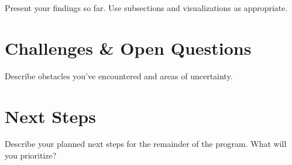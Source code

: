 \documentclass[midterm]{sparreport}
\begin{document}
Present your findings so far. Use subsections and visualizations as appropriate.

\section{Challenges \& Open Questions}

Describe obstacles you've encountered and areas of uncertainty.

\section{Next Steps}

Describe your planned next steps for the remainder of the program. What will you prioritize?

%



\end{document}
